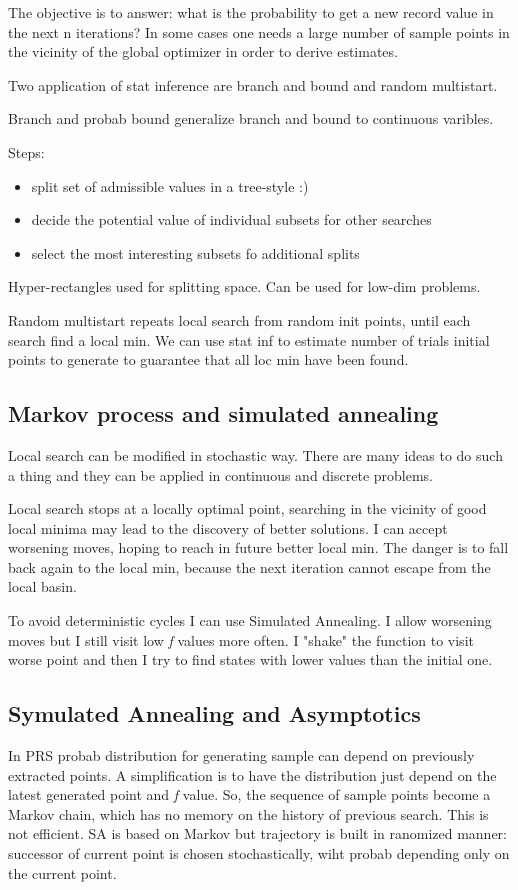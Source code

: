 \documentclass[11pt]{article}
\begin{document}
The objective is to answer: what is the probability to get a new record value in the next n
iterations?  In some cases one needs a large number of sample points in the vicinity of the global optimizer in order to derive estimates.

Two application of stat inference are branch and bound and random multistart.

Branch and probab bound generalize branch and bound to continuous varibles.

Steps: 
\begin{itemize}
\item split set of admissible values in a tree-style :)
\item decide the potential value of individual subsets for other searches
\item select the most interesting subsets fo additional splits
\end{itemize}
	
Hyper-rectangles used for splitting space. Can be used for low-dim problems.

Random multistart repeats local search from random init points, until each search find a local min. We can use stat inf to estimate number of trials initial points to generate to guarantee that all loc min have been found. 

\subsection{Markov process and simulated annealing}

Local search can be modified in stochastic way. There are many ideas to do such a thing and they can be applied in continuous and discrete problems. 

Local search stops at a locally optimal point, searching in the vicinity of good local minima may lead to the
discovery of better solutions. I can accept worsening moves, hoping to reach in future better local min. The danger is to fall back again to the local min, because the next iteration cannot escape from the local basin. 

To avoid deterministic cycles I can use Simulated Annealing. I allow worsening moves but I still visit low \textit{f} values more often. I "shake" the function to visit worse point and then I try to find states with lower values than the initial one.

\subsection{Symulated Annealing and Asymptotics}
In PRS probab distribution for generating sample can depend on previously extracted points. A simplification is  to have the distribution just depend on the latest generated point and \textit{f} value. So, the sequence of sample points become a Markov chain, which has no memory on the history of previous search. This is not efficient.
SA is based on Markov but trajectory is built in ranomized manner: successor of current point is chosen stochastically, wiht probab depending only on the current point.
\end{document}
